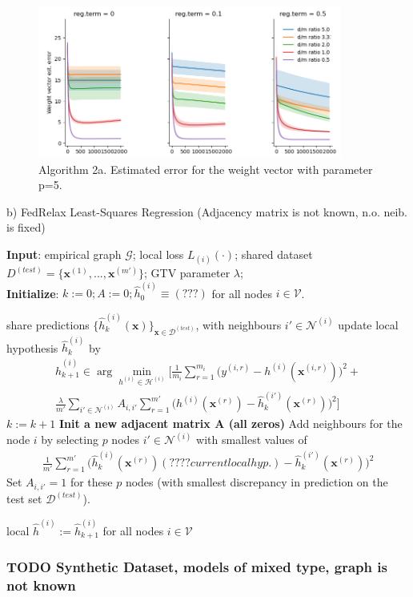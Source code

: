 \documentclass{article}
\newcommand{\graph}{\mathcal{G}}
\begin{document}
\begin{figure}[h]
\includegraphics[width=10cm]{linreg_nneib_5.png}
\caption{Algorithm 2a. Estimated error for the weight vector with parameter p=5.}
\end{figure}

\begin{algorithm}[htbp]
	\caption{b) FedRelax Least-Squares Regression (Adjacency matrix is not known, n.o. neib. is fixed)}
	\label{alg_X_param}
	{\bf Input}: empirical graph $\graph$; 
	local loss $L_{(i)}{(\cdot)}$; shared dataset $D^{(test)} = \{\mathbf{x}^{(1)}, ..., \mathbf{x}^{(m')}\}$; GTV parameter $\lambda$; \\
	{\bf Initialize}: $k:=0; A:=0; \widehat{h}_{0}^{(i)} \!\equiv\! (???)$ for all nodes $i \in \mathcal{V}$.
	\begin{algorithmic}[1]
		\State share predictions $\{\widehat{h}_{k}^{(i)}(\mathbf{x})\}_{\mathbf{x} \in \mathcal{D}^(test)}$, 
		with neighbours $i' \in \mathcal{N}^{(i)}$ 
		\State update local hypothesis $\widehat{h}_{k}^{(i)}$ by
            \begin{multline*}
            \widehat{h}_{k+1}^{(i)} \in  \arg \min_{h^{(i)} \in \mathcal{H}^{(i)}} 
            \biggl[ \frac{1}{m_i}  \sum_{r=1}^{m_i} \biggl( y^{(i,r)} - h^{(i)}(\mathbf{x}^{(i,r)})  \biggr)^2 + \\
            \frac{\lambda}{m'} \sum_{i' \in \mathcal{N}^{(i)}}A_{i,i'}\sum_{r=1}^{m'} \biggl( h^{(i)}(\mathbf{x}^{(r)}) - \widehat{h}_{k}^{(i')}(\mathbf{x}^{(r)}) \biggr)^2 \biggr]
            \end{multline*}
		\EndFor
		\State $k := k+1$
        \State \textbf{Init a new adjacent matrix A (all zeros)}
        \State Add neighbours for the node $i$ by selecting $p$ nodes $i' \in \mathcal{N}^{(i)}$ with smallest values of
             \begin{align}
                \frac{1}{m'} \sum_{r=1}^{m'} \biggl( \widehat{h}_{k}^{(i)}(\mathbf{x}^{(r)}) (???? current local hyp.) - \widehat{h}_{k}^{(i')}(\mathbf{x}^{(r)}) \biggr)^2 
             \end{align}
        \State Set $A_{i,i'} = 1$ for these $p$ nodes (with smallest discrepancy in prediction on the test set $\mathcal{D}^{(test)}$).
        
        \EndFor
		\EndWhile
			  \Ensure local $\widehat{h}^{(i)} := \widehat{h}_{k+1}^{(i)}$ for all nodes $i \in \mathcal{V}$
	\end{algorithmic}
\end{algorithm}

\newpage
\subsubsection{ TODO Synthetic Dataset, models of mixed type, graph is not known}
\end{document}
